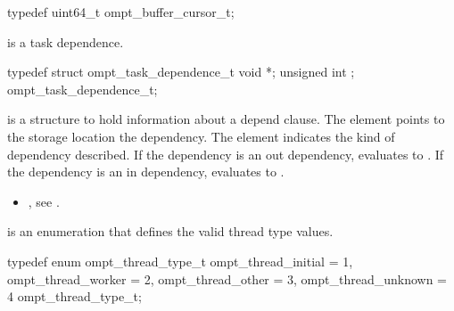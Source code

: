 \begin{ccppspecific}
\begin{omptOther}
typedef uint64_t ompt_buffer_cursor_t;
\end{omptOther}
\end{ccppspecific}





\label{sec:ompt_task_dependence_t}
 is a task dependence.


\begin{ccppspecific}
\begin{omptOther}
typedef struct ompt_task_dependence_t {
  void *;
  unsigned int ;
} ompt_task_dependence_t;
\end{omptOther}
\end{ccppspecific}


\descr
{} is a structure to hold information
about a depend clause.
The element  points to the storage location the dependency.
The element  indicates the kind of dependency described.
If the dependency is an out dependency,  evaluates to .
If the dependency is an in dependency,  evaluates to .

\crossreferences
\begin{itemize}
\item {}, see
.
\end{itemize}



\label{sec:ompt_thread_type_t}
 is an enumeration that defines the valid thread type values.


\begin{ccppspecific}
\begin{omptEnum}
typedef enum ompt_thread_type_t {
  ompt_thread_initial                 = 1,
  ompt_thread_worker                  = 2,
  ompt_thread_other                   = 3,
  ompt_thread_unknown                 = 4
} ompt_thread_type_t;
\end{omptEnum}
\end{ccppspecific}



